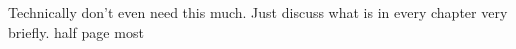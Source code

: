 \label{sec:Introduction}

Technically don't even need this much. Just discuss what is in every chapter very briefly. half page most